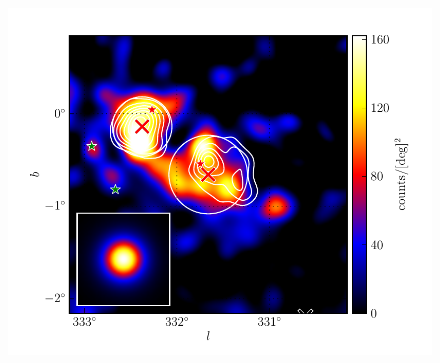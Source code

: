 \documentclass[12pt,preprint]{aastex}
\newcommand{\gev}{\text{GeV}\xspace}
\newcommand{\tev}{\text{TeV}\xspace}
\begin{document}
\begin{figure}
  \begin{center}
    \includegraphics[type=pdf,ext=.pdf,read=.pdf]{source_plots/source_1FGL_J1613.6-5100c}
  \end{center}
  \caption{
  }\label{1FGL_J1613.6-5100c}
\end{figure}
\end{document}
